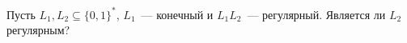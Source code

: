 Пусть $L_1, L_2 \subseteq \{0, 1\}^*$, $L_1$~--- конечный и $L_1 L_2$~--- регулярный. Является ли $L_2$
регулярным?
